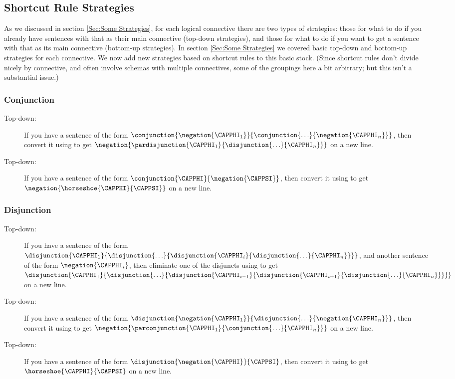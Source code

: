 \subsection{Shortcut Rule Strategies}\label{Sec:Shortcut Rule Strategies}
As we discussed in section \ref{Sec:Some Strategies}, for each logical connective there are two types of strategies: those for what to do if you already have sentences with that as their main connective (top-down strategies), and those for what to do if you want to get a sentence with that as its main connective (bottom-up strategies). 
In section \ref{Sec:Some Strategies} we covered basic top-down and bottom-up strategies for each connective.
We now add new strategies based on shortcut rules to this basic stock.
(Since shortcut rules don't divide nicely by connective, and often involve schemas with multiple connectives, some of the groupings here a bit arbitrary; but this isn't a substantial issue.)

\subsubsection*{Conjunction} 
\begin{description}
\item[ Top-down:] If you have a sentence of the form $\conjunction{\negation{\CAPPHI_1}}{\conjunction{\ldots}{\negation{\CAPPHI_{\integer{n}}}}}$, then convert it using  to get $\negation{\pardisjunction{\CAPPHI_1}{\disjunction{\ldots}{\CAPPHI_{\integer{n}}}}}$ on a new line.
\item[ Top-down:] If you have a sentence of the form $\conjunction{\CAPPHI}{\negation{\CAPPSI}}$, then convert it using  to get $\negation{\horseshoe{\CAPPHI}{\CAPPSI}}$ on a new line. 
\end{description} 
\subsubsection*{Disjunction} 
\begin{description}
\item[ Top-down:] If you have a sentence of the form $\disjunction{\CAPPHI_1}{\disjunction{\ldots}{\disjunction{\CAPPHI_i}{\disjunction{\ldots}{\CAPPHI_{\integer{n}}}}}}$, and another sentence of the form $\negation{\CAPPHI_i}$, then eliminate one of the disjuncts using  to get $\disjunction{\CAPPHI_1}{\disjunction{\ldots}{\disjunction{\CAPPHI_{i-1}}{\disjunction{\CAPPHI_{i+1}}{\disjunction{\ldots}{\CAPPHI_{\integer{n}}}}}}}$ on a new line.
\item[ Top-down:] If you have a sentence of the form $\disjunction{\negation{\CAPPHI_1}}{\disjunction{\ldots}{\negation{\CAPPHI_{\integer{n}}}}}$, then convert it using  to get $\negation{\parconjunction{\CAPPHI_1}{\conjunction{\ldots}{\CAPPHI_{\integer{n}}}}}$ on a new line.
\item[ Top-down:] If you have a sentence of the form $\disjunction{\negation{\CAPPHI}}{\CAPPSI}$, then convert it using  to get $\horseshoe{\CAPPHI}{\CAPPSI}$ on a new line.
\end{description} 
